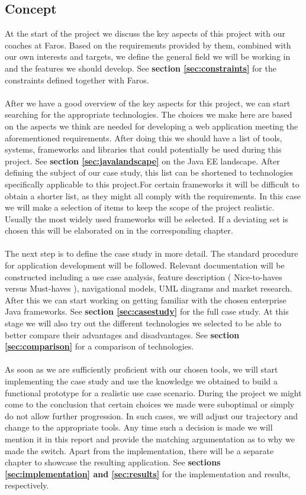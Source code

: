 \documentclass[12pt]{article}
\begin{document}
\begin{multicols}{2}
\subsection{Concept}\label{sec:concept}
At the start of the project we discuss the key aspects of this project with our coaches at Faros. Based on the requirements provided by them, combined with our own interests and targets, we define the general field we will be working in and the features we should develop. See \textbf{section \ref{sec:constraints}} for the constraints defined together with Faros.
\\\\
After we have a good overview of the key aspects for this project, we can start searching for the appropriate technologies. The choices we make here are based on the aspects we think are needed for developing a web application meeting the aforementioned requirements. After doing this we should have a list of tools, systems, frameworks and libraries that could potentially be used during this project. See \textbf{section \ref{sec:javalandscape}} on the Java EE landscape. After defining the subject of our case study, this list can be shortened to technologies specifically applicable to this project.For certain frameworks it will be difficult to obtain a shorter list, as they might all comply with the requirements. In this case we will make a selection of items to keep the scope of the project realistic. Usually the most widely used frameworks will be selected. If a deviating set is chosen this will be elaborated on in the corresponding chapter. 
\\\\
The next step is to define the case study in more detail. The standard procedure for application development will be followed. Relevant documentation will be constructed including a use case analysis, feature description ( Nice-to-haves versus Must-haves ), navigational models, UML diagrams and market research. After this we can start working on getting familiar with the chosen enterprise Java frameworks. See \textbf{section \ref{sec:casestudy}} for the full case study. At this stage we will also try out the different technologies we selected to be able to better compare their advantages and disadvantages. See \textbf{section \ref{sec:comparison}} for a comparison of technologies.
\\\\
As soon as we are sufficiently proficient with our chosen tools, we will start implementing the case study and use the knowledge we obtained to build a functional prototype for a realistic use case scenario. During the project we might come to the conclusion that certain choices we made were suboptimal or simply do not allow further progression. In such cases, we will adjust our trajectory and change to the appropriate tools. Any time such a decision is made we will mention it in this report and provide the matching argumentation as to why we made the switch. Apart from the implementation, there will be a separate chapter to showcase the resulting application. See \textbf{sections \ref{sec:implementation} and \ref{sec:results}} for the implementation and results, respectively.

\end{multicols}
\end{document}
